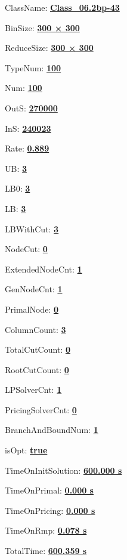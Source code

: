 \documentclass[11pt]{article}
\begin{document}
\pagestyle{empty}


ClassName: \underline{\textbf{Class_06.2bp-43}}
\par
BinSize: \underline{\textbf{300 × 300}}
\par
ReduceSize: \underline{\textbf{300 × 300}}
\par
TypeNum: \underline{\textbf{100}}
\par
Num: \underline{\textbf{100}}
\par
OutS: \underline{\textbf{270000}}
\par
InS: \underline{\textbf{240023}}
\par
Rate: \underline{\textbf{0.889}}
\par
UB: \underline{\textbf{3}}
\par
LB0: \underline{\textbf{3}}
\par
LB: \underline{\textbf{3}}
\par
LBWithCut: \underline{\textbf{3}}
\par
NodeCut: \underline{\textbf{0}}
\par
ExtendedNodeCnt: \underline{\textbf{1}}
\par
GenNodeCnt: \underline{\textbf{1}}
\par
PrimalNode: \underline{\textbf{0}}
\par
ColumnCount: \underline{\textbf{3}}
\par
TotalCutCount: \underline{\textbf{0}}
\par
RootCutCount: \underline{\textbf{0}}
\par
LPSolverCnt: \underline{\textbf{1}}
\par
PricingSolverCnt: \underline{\textbf{0}}
\par
BranchAndBoundNum: \underline{\textbf{1}}
\par
isOpt: \underline{\textbf{true}}
\par
TimeOnInitSolution: \underline{\textbf{600.000 s}}
\par
TimeOnPrimal: \underline{\textbf{0.000 s}}
\par
TimeOnPricing: \underline{\textbf{0.000 s}}
\par
TimeOnRmp: \underline{\textbf{0.078 s}}
\par
TotalTime: \underline{\textbf{600.359 s}}
\par
\newpage
\end{document}
